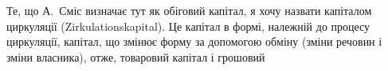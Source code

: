 Те, що А.~Сміс визначає тут як обіговий капітал, я хочу назвати
капіталом циркуляції (Zirkulationskapital). Це капітал в формі,
належній до процесу циркуляції, капітал, що змінює форму за допомогою
обміну (зміни речовин і зміни власника), отже, товаровий капітал і грошовий
\parbreak{}  %
